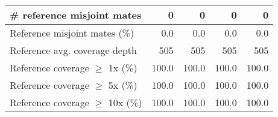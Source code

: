 \documentclass[12pt,a4paper]{article}
\begin{document}
\begin{table}[ht]
\begin{center}
\begin{tabular}{|l*{4}{|r}|}
\# reference misjoint mates & 0 & 0 & 0 & 0 \\ \hline
Reference misjoint mates (\%) & 0.0 & 0.0 & 0.0 & 0.0 \\ \hline
Reference avg. coverage depth & 505 & 505 & 505 & 505 \\ \hline
Reference coverage $\geq$ 1x (\%) & 100.0 & 100.0 & 100.0 & 100.0 \\ \hline
Reference coverage $\geq$ 5x (\%) & 100.0 & 100.0 & 100.0 & 100.0 \\ \hline
Reference coverage $\geq$ 10x (\%) & 100.0 & 100.0 & 100.0 & 100.0 \\ \hline
\end{tabular}
\end{center}
\end{table}
\end{document}
